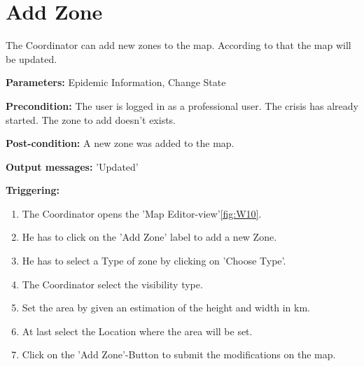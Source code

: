 \section{Add Zone}
\label{operation:AddZone}
The Coordinator can add new zones to the map. According to that the map will
be updated.\\
\begin{description}
\item \textbf{Parameters:} Epidemic Information, Change State
\item \textbf{Precondition:} The user is logged in as a professional user. The
crisis has already started. The zone to add doesn't exists.
\item \textbf{Post-condition:} A new zone was added to the map.
\item \textbf{Output messages:} 'Updated'
\item \textbf{Triggering:}
\begin{enumerate}
\item The Coordinator opens the 'Map Editor-view'\ref{fig:W10}.
\item He has to click on the 'Add Zone' label to add a new Zone.
\item He has to select a Type of zone by clicking on 'Choose Type'.
\item The Coordinator select the visibility type.
\item Set the area by given an estimation of the height and width in km.
\item At last select the Location where the area will be set.
\item Click on the 'Add Zone'-Button to submit the modifications
on the map.
\end{enumerate}
\end{description} 

